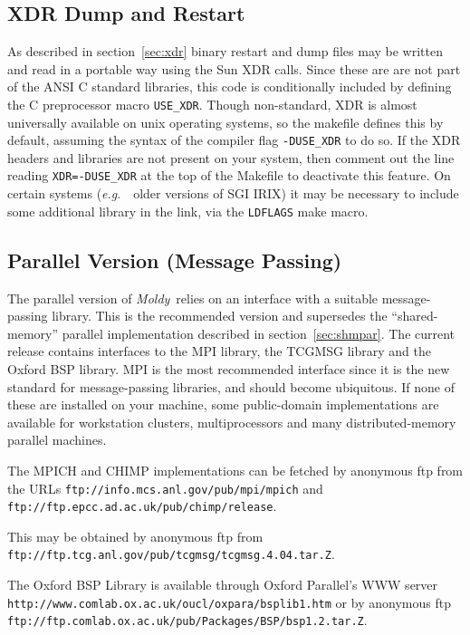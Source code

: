 \documentclass[twoside]{report}
\newcommand{\moldy}{{\em Moldy}}
\newcommand{\eg}{{\em e.g}.\ }
\begin{document}
\subsection{XDR Dump and Restart}
As described in section~\ref{sec:xdr} binary restart and dump files
may be written and read in a portable way using the Sun XDR calls.
Since these are are not part of the ANSI C standard libraries, this
code is conditionally included by defining the C preprocessor macro
\texttt{USE\_XDR}.  Though non-standard, XDR is almost universally
available on unix operating systems, so the makefile defines this
by default, assuming the syntax of the compiler flag
\texttt{-DUSE\_XDR} to do so.  If the XDR headers and libraries are not
present on your system, then comment out the line reading
\texttt{XDR=-DUSE\_XDR} at the top of the Makefile to deactivate this
feature.  On certain systems (\eg\ older versions of SGI IRIX) it may
be necessary to include some additional library in the link, via the
\texttt{LDFLAGS} make macro.

\subsection{Parallel Version (Message Passing)}
\label{sec:spmdpar}
The parallel version of \moldy\ relies on an interface with a suitable
message-passing library.  This is the recommended version and
supersedes the ``shared-memory'' parallel implementation described in
section~\ref{sec:shmpar}.  The current release contains interfaces to
the MPI library\cite{mpi:94}, the TCGMSG library and the Oxford BSP
library.  MPI is the most recommended interface since it is the new
standard for message-passing libraries, and should become ubiquitous.
If none of these are installed on your machine, some public-domain
implementations are available for workstation clusters,
multiprocessors and many distributed-memory parallel machines.

\begin{description}
\raggedright
\item[MPI] The MPICH and CHIMP implementations can be fetched by
  anonymous ftp from the URLs 
  \texttt{ftp://info.mcs.anl.gov/pub/mpi/mpich} and
  \texttt{ftp://ftp.epcc.ad.ac.uk/pub/chimp/release}.
\item[TCGMSG] This may be obtained by anonymous ftp from
  \texttt{ftp://ftp.tcg.anl.gov/pub/tcgmsg/tcgmsg.4.04.tar.Z}.
\item[BSP] The Oxford BSP Library is available through Oxford
  Parallel's WWW server
  \texttt{http://www.comlab.ox.ac.uk/oucl/oxpara/bsplib1.htm} 
  or by anonymous ftp
  \texttt{ftp://ftp.comlab.ox.ac.uk/pub/Packages/BSP/bsp1.2.tar.Z}.
\end{description}
\end{document}
